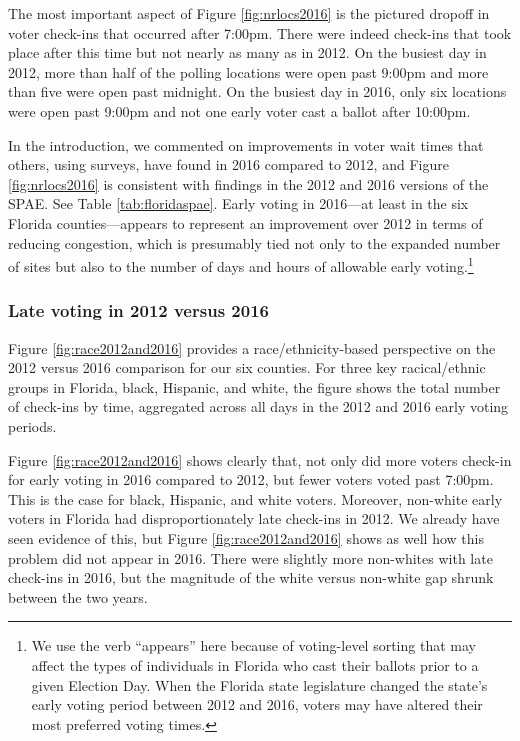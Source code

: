 \documentclass[12pt,titlepage]{article}
\begin{document}
The most important aspect of Figure \ref{fig:nrlocs2016} is the
pictured dropoff in voter check-ins that occurred after 7:00pm.  There
were indeed check-ins that took place after this time but not nearly
as many as in 2012.  On the busiest day in 2012, more than half of the
polling locations were open past 9:00pm and more than five were open
past midnight.  On the busiest day in 2016, only six locations were
open past 9:00pm and not one early voter cast a ballot after 10:00pm.

In the introduction, we commented on improvements in voter wait times
that others, using surveys, have found in 2016 compared to 2012, and
Figure \ref{fig:nrlocs2016} is consistent with findings in the 2012
\citep{spae2012} and 2016 \citep{spae2016} versions of the SPAE.  See
Table \ref{tab:floridaspae}.  Early voting in 2016---at least in the
six Florida counties---appears to represent an improvement over 2012
in terms of reducing congestion, which is presumably tied not only to
the expanded number of sites but also to the number of days and hours
of allowable early voting.\footnote{We use the verb ``appears'' here
  because of voting-level sorting that may affect the types of
  individuals in Florida who cast their ballots prior to a given
  Election Day.  When the Florida state legislature changed the
  state's early voting period between 2012 and 2016, voters may have
  altered their most preferred voting times.}



\subsubsection*{Late voting in 2012 versus 2016}

Figure \ref{fig:race2012and2016} provides a race/ethnicity-based
perspective on the 2012 versus 2016 comparison for our six counties.
For three key racical/ethnic groups in Florida, black, Hispanic, and
white, the figure shows the total number of check-ins by time,
aggregated across all days in the 2012 and 2016 early voting periods.

Figure \ref{fig:race2012and2016} shows clearly that, not only did more
voters check-in for early voting in 2016 compared to 2012, but fewer
voters voted past 7:00pm.  This is the case for black, Hispanic, and
white voters. Moreover, non-white early voters in Florida had
disproportionately late check-ins in 2012.  We already have seen
evidence of this, but Figure \ref{fig:race2012and2016} shows as well
how this problem did not appear in 2016.  There were slightly more
non-whites with late check-ins in 2016, but the magnitude of the white
versus non-white gap shrunk between the two years.
\end{document}
